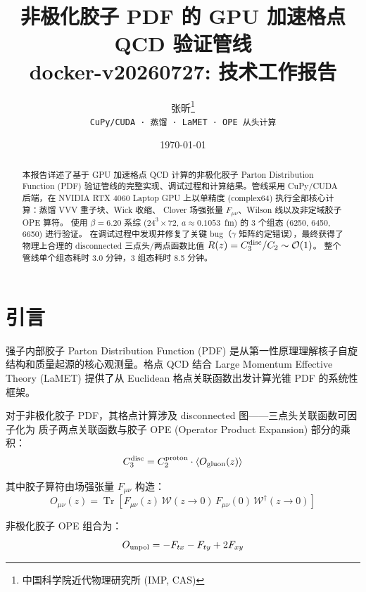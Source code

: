 \documentclass[11pt,a4paper]{article}
\title{\textbf{非极化胶子 PDF 的 GPU 加速格点 QCD 验证管线}\\[4pt]
       \large docker-v20260727: 技术工作报告}
\author{张昕\thanks{中国科学院近代物理研究所 (IMP, CAS)}\\
       \texttt{CuPy/CUDA · 蒸馏 · LaMET · OPE 从头计算}}
\date{\today}
\begin{document}
\maketitle

\begin{abstract}
本报告详述了基于 GPU 加速格点 QCD 计算的非极化胶子 Parton Distribution Function (PDF)
验证管线的完整实现、调试过程和计算结果。管线采用 CuPy/CUDA 后端，在 NVIDIA RTX 4060
Laptop GPU 上以单精度 (complex64) 执行全部核心计算：蒸馏 VVV 重子块、Wick 收缩、
Clover 场强张量 $F_{\mu\nu}$、Wilson 线以及非定域胶子 OPE 算符。
使用 $\beta = 6.20$ 系综 ($24^3 \times 72$, $a \approx 0.1053$~fm)
的 3 个组态 (6250, 6450, 6650) 进行验证。
在调试过程中发现并修复了关键 bug（$\gamma$ 矩阵约定错误），最终获得了物理上合理的
disconnected 三点头/两点函数比值 $R(z) = C_3^{\rm disc}/C_2 \sim \mathcal{O}(1)$。
整个管线单个组态耗时 3.0 分钟，3 组态耗时 8.5 分钟。
\end{abstract}

\tableofcontents

\section{引言}

强子内部胶子 Parton Distribution Function (PDF) 是从第一性原理理解核子自旋
结构和质量起源的核心观测量。格点 QCD 结合 Large Momentum Effective Theory
(LaMET)\cite{Ji:2013dva} 提供了从 Euclidean 格点关联函数出发计算光锥 PDF
的系统性框架。

对于非极化胶子 PDF，其格点计算涉及 disconnected 图——三点头关联函数可因子化为
质子两点关联函数与胶子 OPE (Operator Product Expansion) 部分的乘积\cite{note_gluon}：
\begin{equation}\label{eq:factorization}
  C_3^{\rm disc} = C_2^{\rm proton} \cdot \langle O_{\rm gluon}(z) \rangle
\end{equation}

其中胶子算符由场强张量 $F_{\mu\nu}$ 构造：
\begin{equation}\label{eq:gluon_op}
  O_{\mu\nu}(z) = \operatorname{Tr}\left[F_{\mu\nu}(z)\,
    \mathcal{W}(z \to 0)\,F_{\mu\nu}(0)\,
    \mathcal{W}^{\dagger}(z \to 0)\right]
\end{equation}

非极化胶子 OPE 组合为：
\begin{equation}\label{eq:unpol_combination}
  O_{\rm unpol} = -F_{tx} - F_{ty} + 2F_{xy}
\end{equation}
\end{document}

